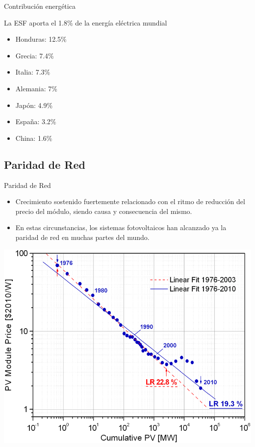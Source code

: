 \documentclass[xcolor={usenames,svgnames,dvipsnames}]{beamer}
\begin{document}
\begin{frame}[label={sec:org32b60f1}]{Contribución energética}
\begin{block}{La ESF aporta el 1.8\% de la energía eléctrica mundial}
\begin{itemize}
\item Honduras: 12.5\%
\item Grecia: 7.4\%
\item Italia: 7.3\%
\item Alemania: 7\%
\item Japón: 4.9\%
\item España: 3.2\%
\item China: 1.6\%
\end{itemize}
\end{block}
\end{frame}

\subsection{Paridad de Red}
\label{sec:orgb48d5f5}

\begin{frame}[label={sec:orgbdf212b}]{Paridad de Red}
\begin{itemize}
\item Crecimiento sostenido fuertemente relacionado con el ritmo de
reducción del precio del módulo, siendo causa y consecuencia del
mismo.

\item En estas circunstancias, los sistemas fotovoltaicos han alcanzado ya
la paridad de red en muchas partes del mundo.
\end{itemize}
\end{frame}


\begin{frame}[label={sec:orgbfcb53d}]{}
\begin{center}
\includegraphics[width=.9\linewidth]{../figs/CurvaAprendizajeFV_BreyerPiP.png}
\end{center}
\end{frame}
\end{document}

